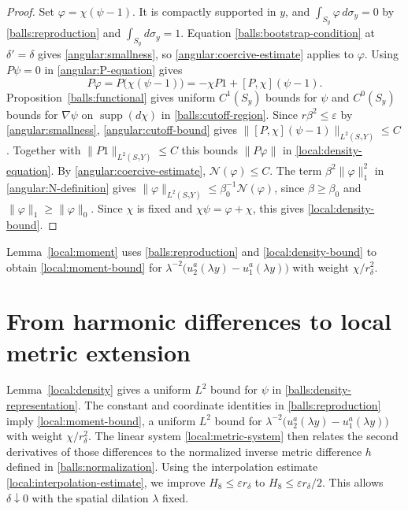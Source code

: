 \documentclass[11pt,a4paper]{article}
\theoremstyle{definition}
\theoremstyle{remark}
\newcommand{\eps}{\varepsilon}
\numberwithin{equation}{section}
\begin{document}
\begin{proof}
Set $\varphi=\chi(\psi-1)$. It is compactly supported in $y$, and
$\int_{S_y}\varphi\,d\sigma_y=0$ by \eqref{balls:reproduction}
and $\int_{S_y}d\sigma_y=1$. Equation
\eqref{balls:bootstrap-condition} at $\delta'=\delta$ gives
\eqref{angular:smallness}, so \eqref{angular:coercive-estimate}
applies to $\varphi$. Using $P\psi=0$ in \eqref{angular:P-equation}
gives
\begin{equation}\label{local:density-equation}
 P\varphi=P\bigl(\chi(\psi-1)\bigr)
       =-\chi P1+[P,\chi](\psi-1).
\end{equation}
Proposition~\ref{balls:functional} gives uniform $C^1(S_y)$ bounds
for $\psi$ and $C^0(S_y)$ bounds for $\nabla\psi$ on
$\operatorname{supp}(d\chi)$ in \eqref{balls:cutoff-region}.
Since $r\beta^2\le\eps$ by \eqref{angular:smallness},
\eqref{angular:cutoff-bound} gives
$\|[P,\chi](\psi-1)\|_{L^2(S_\gamma Y)}\le C$.
Together with $\|P1\|_{L^2(S_\gamma Y)}\le C$ this bounds
$\|P\varphi\|$ in \eqref{local:density-equation}.
By \eqref{angular:coercive-estimate}, $\mathcal N(\varphi)\le C$.
The term $\beta^2\|\varphi\|_1^2$ in \eqref{angular:N-definition}
gives $\|\varphi\|_{L^2(S_\gamma Y)}\le\beta_0^{-1}\mathcal N(\varphi)$,
since $\beta\ge\beta_0$ and $\|\varphi\|_1\ge\|\varphi\|_0$.
Since $\chi$ is fixed and $\chi\psi=\varphi+\chi$, this gives
\eqref{local:density-bound}.
\end{proof}

Lemma~\ref{local:moment} uses \eqref{balls:reproduction} and
\eqref{local:density-bound} to obtain \eqref{local:moment-bound}
for $\lambda^{-2}\bigl(u_2^a(\lambda y)-u_1^a(\lambda y)\bigr)$
with weight $\chi/r_\delta^2$.
\section{From harmonic differences to local metric extension}\label{sec:bootstrap}

Lemma~\ref{local:density} gives a uniform $L^2$ bound for $\psi$ in
\eqref{balls:density-representation}.  The constant and coordinate
identities in \eqref{balls:reproduction} imply
\eqref{local:moment-bound}, a uniform $L^2$ bound for
$\lambda^{-2}\bigl(u_2^a(\lambda y)-u_1^a(\lambda y)\bigr)$
with weight $\chi/r_\delta^2$.
The linear system \eqref{local:metric-system} then relates the
second derivatives of those differences to the normalized inverse
metric difference $h$ defined in \eqref{balls:normalization}.
Using the interpolation estimate \eqref{local:interpolation-estimate},
we improve $H_8\le\varepsilon r_\delta$ to
$H_8\le\varepsilon r_\delta/2$.  This allows $\delta\downarrow0$
with the spatial dilation $\lambda$ fixed.
\end{document}
